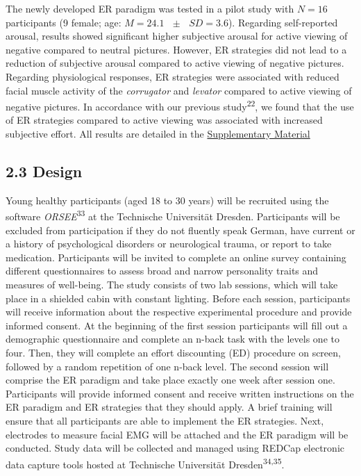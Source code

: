 \documentclass[
  english,
  man,floatsintext]{apa6}
\begin{document}
The newly developed ER paradigm was tested in a pilot study with \(N=16\) participants (9 female; age: \(M = 24.1\text{ }\pm\text{ }SD = 3.6\)).
Regarding self-reported arousal, results showed significant higher subjective arousal for active viewing of negative compared to neutral pictures.
However, ER strategies did not lead to a reduction of subjective arousal compared to active viewing of negative pictures.
Regarding physiological responses, ER strategies were associated with reduced facial muscle activity of the \emph{corrugator} and \emph{levator} compared to active viewing of negative pictures.
In accordance with our previous study\textsuperscript{22}, we found that the use of ER strategies compared to active viewing was associated with increased subjective effort.
All results are detailed in the \protect\hyperlink{SupplementaryMaterial}{Supplementary Material}

\hypertarget{design}{%
\subsection{2.3 Design}\label{design}}

Young healthy participants (aged 18 to 30 years) will be recruited using the software \emph{ORSEE}\textsuperscript{33} at the Technische Universität Dresden.
Participants will be excluded from participation if they do not fluently speak German, have current or a history of psychological disorders or neurological trauma, or report to take medication.
Participants will be invited to complete an online survey containing different questionnaires to assess broad and narrow personality traits and measures of well-being.
The study consists of two lab sessions, which will take place in a shielded cabin with constant lighting.
Before each session, participants will receive information about the respective experimental procedure and provide informed consent.
At the beginning of the first session participants will fill out a demographic questionnaire and complete an n-back task with the levels one to four.
Then, they will complete an effort discounting (ED) procedure on screen, followed by a random repetition of one n-back level.
The second session will comprise the ER paradigm and take place exactly one week after session one.
Participants will provide informed consent and receive written instructions on the ER paradigm and ER strategies that they should apply.
A brief training will ensure that all participants are able to implement the ER strategies.
Next, electrodes to measure facial EMG will be attached and the ER paradigm will be conducted.
Study data will be collected and managed using REDCap electronic data capture tools hosted at Technische Universität Dresden\textsuperscript{34,35}.
\end{document}
